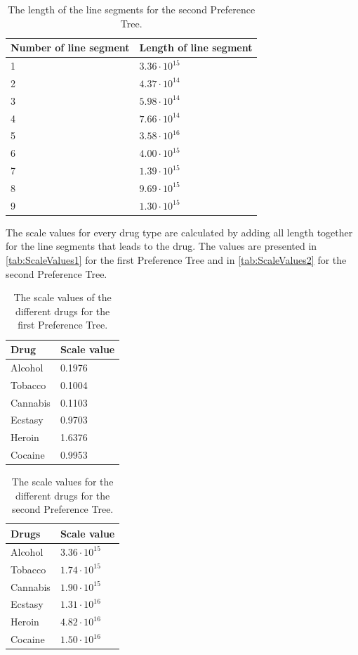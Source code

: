 \noindent 
% 
\begin{table}[H]
	\centering
	\begin{tabular}{@{}ll@{}}
		\toprule
		Number of line segment  & Length of line segment \\ \midrule
		1						& $3.36\cdot10^{15}$   \\
		2      					& $4.37\cdot10^{14}$   \\
		3      					& $5.98\cdot10^{14}$   \\
		4      					& $7.66\cdot10^{14}$   \\
		5      					& $3.58\cdot10^{16}$   \\
		6     					& $4.00\cdot10^{15}$   \\
		7      					& $1.39\cdot10^{15}$   \\
		8						& $9.69\cdot10^{15}$   \\
		9						& $1.30\cdot10^{15}$   \\ \bottomrule
	\end{tabular}
	\caption{The length of the line segments for the second Preference Tree.}
	\label{tab:Length2}
\end{table} 
\noindent 
%
The scale values for every drug type are calculated by adding all length together for the line segments that leads to the drug. The values are presented in \autoref{tab:ScaleValues1} for the first Preference Tree and in \autoref{tab:ScaleValues2} for the second Preference Tree.\blankline
% 
\begin{table}[H]
	\centering
	\begin{tabular}{@{}ll@{}}
		\toprule
		Drug      & Scale value \\ \midrule
		Alcohol	  & 0.1976   \\
		Tobacco	  & 0.1004   \\
		Cannabis  & 0.1103   \\
		Ecstasy	  & 0.9703   \\
		Heroin	  & 1.6376   \\
		Cocaine	  & 0.9953   \\	\bottomrule
	\end{tabular}
	\caption{The scale values of the different drugs for the first Preference Tree.}
	\label{tab:ScaleValues1}
\end{table} 
\noindent 
%
\begin{table}[H]
	\centering
	\begin{tabular}{@{}ll@{}}
		\toprule
		Drugs     & Scale value \\ \midrule
		Alcohol	  & $3.36\cdot10^{15}$   \\
		Tobacco	  & $1.74\cdot10^{15}$   \\
		Cannabis  & $1.90\cdot10^{15}$   \\
		Ecstasy	  & $1.31\cdot10^{16}$   \\
		Heroin	  & $4.82\cdot10^{16}$   \\
		Cocaine	  & $1.50\cdot10^{16}$   \\	\bottomrule
	\end{tabular}
	\caption{The scale values for the different drugs for the second Preference Tree.}
	\label{tab:ScaleValues2}
\end{table} 
